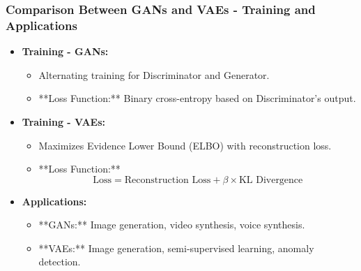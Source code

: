 \documentclass[aspectratio=169]{beamer}
\begin{document}
\begin{frame}[fragile]
    \frametitle{Comparison Between GANs and VAEs - Training and Applications}
    \begin{itemize}
        \item \textbf{Training - GANs:}
        \begin{itemize}
            \item Alternating training for Discriminator and Generator.
            \item **Loss Function:** Binary cross-entropy based on Discriminator's output.
        \end{itemize}
        
        \item \textbf{Training - VAEs:}
        \begin{itemize}
            \item Maximizes Evidence Lower Bound (ELBO) with reconstruction loss.
            \item **Loss Function:**
            \[
            \text{Loss} = \text{Reconstruction Loss} + \beta \times \text{KL Divergence}
            \]
        \end{itemize}
        
        \item \textbf{Applications:}
        \begin{itemize}
            \item **GANs:** Image generation, video synthesis, voice synthesis.
            \item **VAEs:** Image generation, semi-supervised learning, anomaly detection.
        \end{itemize}
    \end{itemize}
\end{frame}
\end{document}
